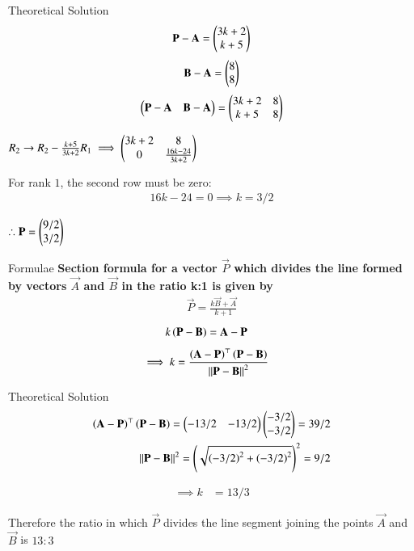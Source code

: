 \documentclass{beamer}
\begin{document}
\begin{frame}{Theoretical Solution}
\begin{align}
            \mathbf{P}-\mathbf{A} = \begin{pmatrix}3k+2\\k+5\end{pmatrix}
\end{align}
\begin{align}
            \mathbf{B}-\mathbf{A} = \begin{pmatrix}8\\8\end{pmatrix}
\end{align}
\begin{align}
            \begin{pmatrix}\mathbf{P}-\mathbf{A}& \mathbf{B}-\mathbf{A}\end{pmatrix} = \begin{pmatrix}3k+2 & 8\\k+5 & 8\end{pmatrix}
\end{align}
\begin{center}
$R_2 \rightarrow R_2 - \frac{k+5}{3k+2}R_1 \implies \begin{pmatrix}3k+2 & 8\\0 & \frac{16k-24}{3k+2}\end{pmatrix}$
\end{center}
For rank $1$, the second row must be zero:
\begin{align}
    16k-24=0 \implies k=3/2
\end{align}
\begin{center}
$\therefore \vec{P}=\begin{myvec}{9/2\\3/2}\end{myvec}$
\end{center}
\end{frame}

\begin{frame}{Formulae}
\textbf{Section formula for a vector $\vec{P}$ which divides the line formed by vectors $\vec{A}$ and $\vec{B}$ in the ratio k:1 is given by}
\begin{align}
    \vec{P}=\frac{k\vec{B}+\vec{A}}{k+1}
\end{align}
\begin{align}
			k\left(\mathbf{P}-\mathbf{B}\right)&= \mathbf{A}-\mathbf{P}
\end{align}
\begin{align}
			\implies k &=
			\frac{\left(\mathbf{A}-\mathbf{P}\right)^{\top}\left(\mathbf{P}-\mathbf{B}\right)}{\left\lVert\mathbf{P}-\mathbf{B}\right\rVert^2}
			\label{eq:section_formula-k}
\end{align}
\end{frame}
\begin{frame}{Theoretical Solution}
\begin{align}
\left(\mathbf{A}-\mathbf{P}\right)^{\top}\left(\mathbf{P}-\mathbf{B}\right) = \begin{pmatrix}-13/2 & -13/2\end{pmatrix}\begin{pmatrix}-3/2\\-3/2\end{pmatrix} = 39/2\\
{\left\lVert\mathbf{P}-\mathbf{B}\right\rVert^2} = \left(\sqrt{\left(-3/2\right)^2 + \left(-3/2\right)^2}\right)^2 = 9/2
\end{align}

\begin{align}
\implies k &= 13/3
\end{align}

Therefore the ratio in which $\vec{P}$ divides the line segment joining the points $\vec{A}$ and $\vec{B}$ is $13:3$\\
\end{frame}
\end{document}
